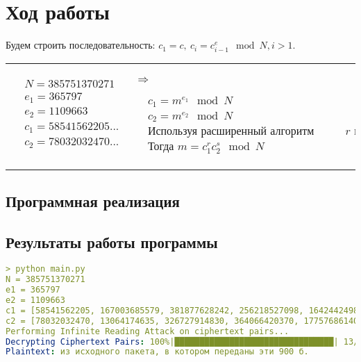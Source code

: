 \documentclass[a4paper, 14pt]{report}
\begin{document}
\chapter*{Ход работы}
{}
Будем строить последовательность: 
$c_1 = c, ~c_i = c_{i-1}^{e} \mod N, i > 1$.
\begin{center}
    \begin{tabularx}{\textwidth}{p{}|X}
    $\begin{aligned}
          & N = 385751370271 \\
          & e_1 = 365797 \\
          & e_2 = 1109663 \\
          & c_1 = 58541562205... \\
          & c_2 = 78032032470... \\
      \end{aligned}$ &
    \begin{minipage}{1em}
      $\Rightarrow$
    \end{minipage}
    $\begin{aligned}
        & c_1 = m^{e_1} \mod N \\
        & c_2 = m^{e_2} \mod N \\
        & \text{Используя расширенный алгоритм Евклида, находим } r \text{ и } s \text{, такие что } r e_1 + s e_2 = 1\\
        & \text{Тогда } m = c_1^r c_2^s \mod N
      \end{aligned}$
    \end{tabularx}
  \end{center}

\section*{Программная реализация}
{}





\section*{Результаты работы программы}
{}

\begin{lstlisting}[language=YAML, caption=Вывод в консоль]
> python main.py
N = 385751370271
e1 = 365797
e2 = 1109663
c1 = [58541562205, 167003685579, 381877628242, 256218527098, 164244249864, 6588741823, 180308234660, 174572441677, 259951955034, 378589342820, 319378579620, 21405495597, 226860843155]
c2 = [78032032470, 13064174635, 326727914830, 364066420370, 177576861402, 65863828523, 111437045566, 124743274954, 119577259869, 85769669875, 4688914942, 261002397567, 341722428571]
Performing Infinite Reading Attack on ciphertext pairs...
Decrypting Ciphertext Pairs: 100%|████████████████████████████████| 13/13 [00:00<00:00, 53667.28it/s]
Plaintext: из исходного пакета, в котором переданы эти 900 б.
\end{lstlisting}
\end{document}
